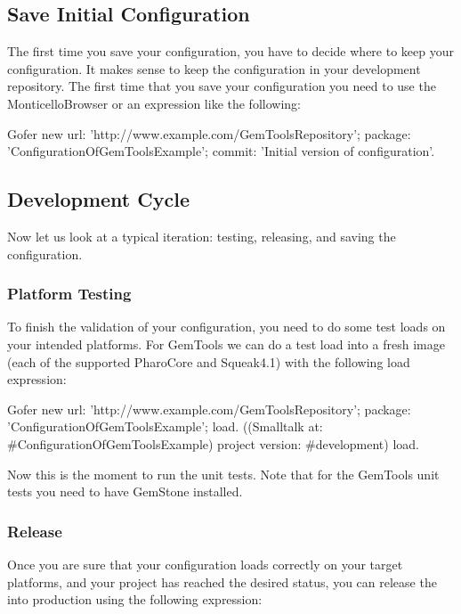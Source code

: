 \documentclass[a4paper,10pt,twoside]{book}
\begin{document}
\subsection{Save Initial Configuration}

The first time you save your configuration, you have to decide where to keep your configuration. It makes sense to keep the configuration in your development repository. The first time that you save your configuration you need to use the MonticelloBrowser or an expression like the following:

\begin{code}{}
  Gofer new
     url: 'http://www.example.com/GemToolsRepository';
     package: 'ConfigurationOfGemToolsExample';
     commit: 'Initial version of configuration'.
\end{code}     


\subsection{Development Cycle}
Now let us look at a typical iteration: testing, releasing, and saving the configuration.
 
\subsubsection{Platform Testing}
To finish the validation of your configuration, you need to do some test loads on your intended platforms. For GemTools we can do a test load into a fresh image (each of the supported PharoCore and Squeak4.1) with the following load expression:

\begin{code}{}
Gofer new
  url: 'http://www.example.com/GemToolsRepository';
  package: 'ConfigurationOfGemToolsExample';
  load.
((Smalltalk at: #ConfigurationOfGemToolsExample)
     project version: #development) load.
\end{code}     
     
Now this is the moment to run the unit tests. Note that for the GemTools unit tests you need to have GemStone installed.

\subsubsection{Release}
Once you are sure that your configuration loads correctly on your target platforms, and your project has reached the desired status, you can release the  into production using the following expression:
\end{document}
